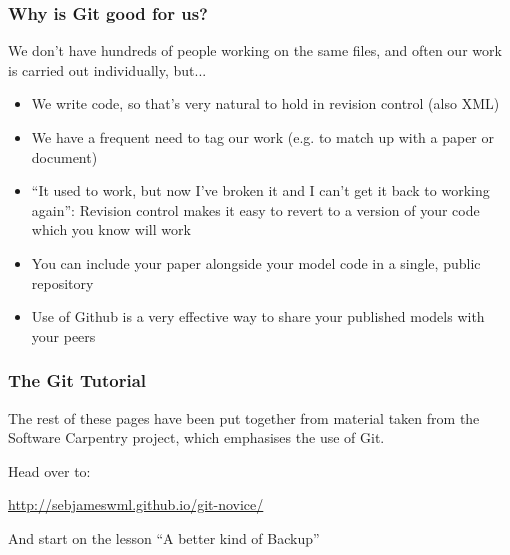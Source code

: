 \documentclass{beamer}
\begin{document}
\begin{frame}
  \frametitle{Why is Git good for us?}
  We don't have hundreds of people working on the same files, and
  often our work is carried out individually, but...
  \begin{itemize}
    \pause \item We write code, so that's very natural to hold in
    revision control (also XML)
    \pause \item We have a frequent need to \alert{tag} our work (e.g. to
    match up with a paper or document)
    \pause \item ``It used to work, but now I've broken it and I can't
    get it back to working again'': Revision control makes it easy to
    revert to a version of your code which you know will work
    \pause \item You can include your paper alongside your model code
    in a single, public repository
    \item Use of Github is a very effective way to share your
    published models with your peers
  \end{itemize}
\end{frame}

\begin{frame}
  \frametitle{The Git Tutorial}
  The rest of these pages have been put together from material taken
  from the Software Carpentry project, which emphasises the use of
  Git.

  Head over to:

  \url{http://sebjameswml.github.io/git-novice/}

  And start on the lesson ``A better kind of Backup''

\end{frame}
\end{document}
